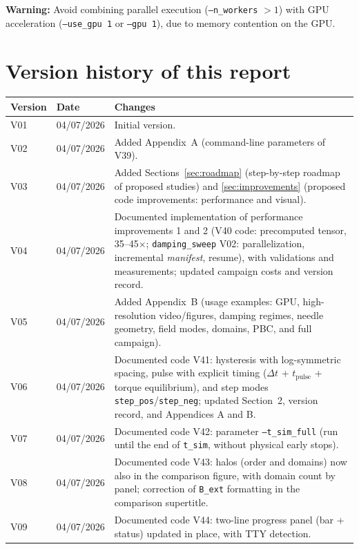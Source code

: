 \documentclass[11pt,a4paper]{article}
\newcommand{\code}[1]{\texttt{#1}}
\begin{document}
\noindent \textbf{Warning:} Avoid combining parallel execution (\code{--n\_workers} $> 1$) with GPU acceleration (\code{--use\_gpu 1} or \code{--gpu 1}), due to memory contention on the GPU.

\section*{Version history of this report}

\begin{tabular}{@{}lll@{}}
\toprule
\textbf{Version} & \textbf{Date} & \textbf{Changes} \\
\midrule
V01 & 04/07/2026 & Initial version. \\
V02 & 04/07/2026 & Added Appendix~A (command-line parameters of V39). \\
V03 & 04/07/2026 & Added Sections~\ref{sec:roadmap} (step-by-step roadmap of proposed studies) and \ref{sec:improvements} (proposed code improvements: performance and visual). \\
V04 & 04/07/2026 & Documented implementation of performance improvements 1 and 2 (V40 code: precomputed tensor, 35--45$\times$; \code{damping\_sweep} V02: parallelization, incremental \emph{manifest}, resume), with validations and measurements; updated campaign costs and version record. \\
V05 & 04/07/2026 & Added Appendix~B (usage examples: GPU, high-resolution video/figures, damping regimes, needle geometry, field modes, domains, PBC, and full campaign). \\
V06 & 04/07/2026 & Documented code V41: hysteresis with log-symmetric spacing, pulse with explicit timing ($\Delta t$ + $t_{\mathrm{pulse}}$ + torque equilibrium), and step modes \code{step\_pos}/\code{step\_neg}; updated Section~2, version record, and Appendices A and B. \\
V07 & 04/07/2026 & Documented code V42: parameter \code{--t\_sim\_full} (run until the end of \code{t\_sim}, without physical early stops). \\
V08 & 04/07/2026 & Documented code V43: halos (order and domains) now also in the comparison figure, with domain count by panel; correction of \code{B\_ext} formatting in the comparison supertitle. \\
V09 & 04/07/2026 & Documented code V44: two-line progress panel (bar + status) updated in place, with TTY detection. \\

\end{tabular}
\end{document}

